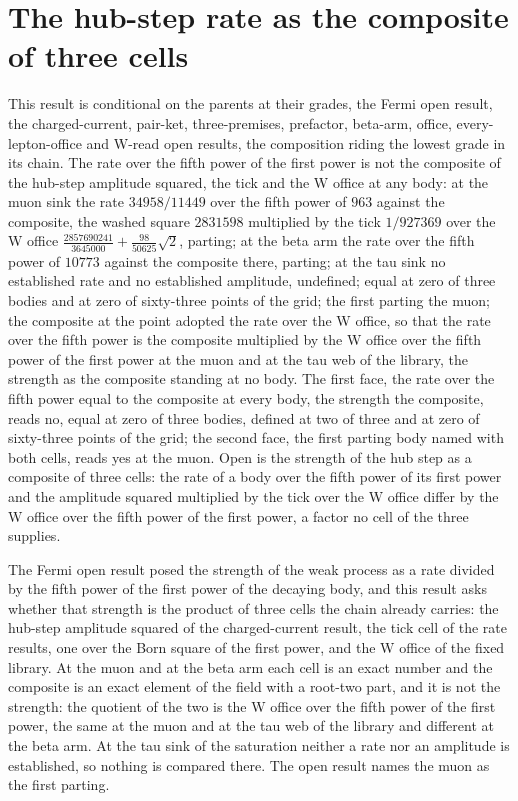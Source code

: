 \section{The hub-step rate as the composite of three cells}\label{mod:IX-2-D541239-w-fchs}
\begin{chwall}\label{box:IX-2-D541239-w-fchs:1}
This result is conditional on the parents at their grades, the Fermi open result, the charged-current, pair-ket, three-premises, prefactor, beta-arm, office, every-lepton-office and W-read open results, the composition riding the lowest grade in its chain. The rate over the fifth power of the first power is not the composite of the hub-step amplitude squared, the tick and the W office at any body: at the muon sink the rate $34958/11449$ over the fifth power of $963$ against the composite, the washed square $2831598$ multiplied by the tick $1/927369$ over the W office $\tfrac{2857690241}{3645000} + \tfrac{98}{50625}\sqrt{2}$, parting; at the beta arm the rate over the fifth power of $10773$ against the composite there, parting; at the tau sink no established rate and no established amplitude, undefined; equal at zero of three bodies and at zero of sixty-three points of the grid; the first parting the muon; the composite at the point adopted the rate over the W office, so that the rate over the fifth power is the composite multiplied by the W office over the fifth power of the first power at the muon and at the tau web of the library, the strength as the composite standing at no body.
The first face, the rate over the fifth power equal to the composite at every body, the strength the composite, reads no, equal at zero of three bodies, defined at two of three and at zero of sixty-three points of the grid; the second face, the first parting body named with both cells, reads yes at the muon. Open is the strength of the hub step as a composite of three cells: the rate of a body over the fifth power of its first power and the amplitude squared multiplied by the tick over the W office differ by the W office over the fifth power of the first power, a factor no cell of the three supplies.
\end{chwall}
The Fermi open result posed the strength of the weak process as a rate divided by the fifth power of the first power of the decaying body, and this result asks whether that strength is the product of three cells the chain already carries: the hub-step amplitude squared of the charged-current result, the tick cell of the rate results, one over the Born square of the first power, and the W office of the fixed library. At the muon and at the beta arm each cell is an exact number and the composite is an exact element of the field with a root-two part, and it is not the strength: the quotient of the two is the W office over the fifth power of the first power, the same at the muon and at the tau web of the library and different at the beta arm. At the tau sink of the saturation neither a rate nor an amplitude is established, so nothing is compared there. The open result names the muon as the first parting.
